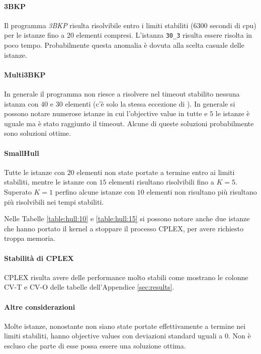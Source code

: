 \paragraph{3BKP}
Il programma \emph{3BKP} risulta risolvibile entro i limiti stabiliti ($6300$ secondi di cpu)
per le istanze fino a 20 elementi compresi. L'istanza \verb|30_3| risulta
essere risolta in poco tempo. Probabilmente questa anomalia è dovuta alla
scelta casuale delle istanze.

\paragraph{Multi3BKP}
In generale il programma  non riesce a risolvere nel timeout
stabilito nessuna istanza con $40$ e $30$ elementi (c'è solo la stessa eccezione
di ). 
In generale si possono notare numerose istanze in cui l'objective value in tutte
e $5$ le istanze è uguale ma è stato raggiunto il timeout. Alcune di queste
soluzioni probabilmente sono soluzioni ottime.


\paragraph{SmallHull}
Tutte le istanze con $20$ elementi non state portate a termine entro ai limiti
stabiliti, mentre le istanze con $15$ elementi risultano risolvibili fino a
$K = 5$. 
Superato $K = 1$ perfino alcune istanze con $10$ elementi non risultano più risultano
più risolvibili nei tempi stabiliti.

Nelle Tabelle \ref{table:hull:10} e \ref{table:hull:15} si possono notare
anche due istanze che hanno portato  il kernel a stoppare il processo CPLEX,
per avere richiesto troppa memoria. 

\paragraph{Stabilità di CPLEX}
CPLEX risulta avere delle performance molto stabili come mostrano le colonne
CV-T e CV-O delle tabelle dell'Appendice \ref{sec:results}.

\paragraph{Altre considerazioni}
Molte istanze, nonostante non siano state portate effettivamente a termine nei
limiti stabiliti, hanno objective values con deviazioni standard uguali a $0$.
Non è escluso che parte di esse possa essere una soluzione ottima.




